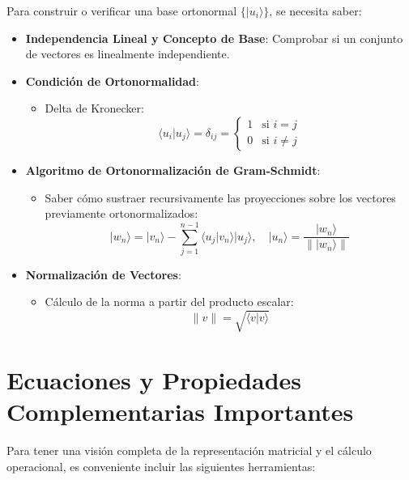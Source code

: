 \documentclass{article}
\begin{document}
Para construir o verificar una base ortonormal $\{|u_i\rangle\}$, se necesita saber:

\begin{itemize}
    \item \textbf{Independencia Lineal y Concepto de Base}: Comprobar si un conjunto de vectores es linealmente independiente.
    \item \textbf{Condición de Ortonormalidad}:
    \begin{itemize}
        \item Delta de Kronecker:
        \[
        \langle u_i|u_j\rangle = \delta_{ij} = 
        \begin{cases} 
        1 & \text{si } i = j \\ 
        0 & \text{si } i \neq j 
        \end{cases}
        \]
    \end{itemize}
    \item \textbf{Algoritmo de Ortonormalización de Gram-Schmidt}:
    \begin{itemize}
        \item Saber cómo sustraer recursivamente las proyecciones sobre los vectores previamente ortonormalizados:
        \[
        |w_n\rangle = |v_n\rangle - \sum_{j=1}^{n-1} \langle u_j|v_n\rangle |u_j\rangle, \quad |u_n\rangle = \frac{|w_n\rangle}{\||w_n\rangle\|}
        \]
    \end{itemize}
    \item \textbf{Normalización de Vectores}:
    \begin{itemize}
        \item Cálculo de la norma a partir del producto escalar:
        \[
        \|v\| = \sqrt{\langle v|v\rangle}
        \]
    \end{itemize}
\end{itemize}

\section{Ecuaciones y Propiedades Complementarias Importantes}

Para tener una visión completa de la representación matricial y el cálculo operacional, es conveniente incluir las siguientes herramientas:
\end{document}
